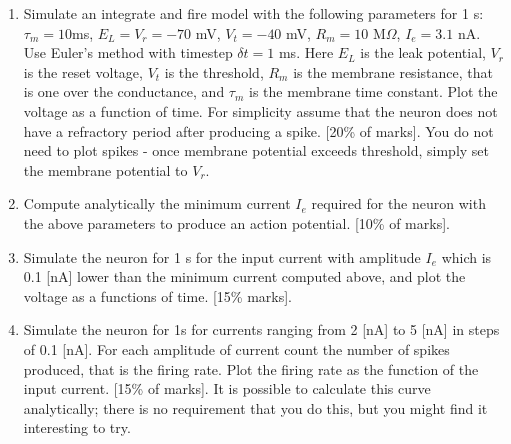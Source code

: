 \documentclass[11pt,a4paper]{scrartcl}
\begin{document}
\begin{enumerate}

\item Simulate an integrate and fire model with the following
  parameters for 1 s: $\tau_m = 10 $ms, $E_L = V_r = -70$ mV, $V_t =
  -40$ mV, $R_m= 10$ M$\Omega$, $I_e = 3.1 $ nA. Use Euler's method
  with timestep $\delta t = 1$ ms. Here $E_L$ is the leak potential,
  $V_r$ is the reset voltage, $V_t$ is the threshold, $R_m$ is the
  membrane resistance, that is one over the conductance, and $\tau_m$
  is the membrane time constant. Plot the voltage as a function of
  time. For simplicity assume that the neuron does not have a
  refractory period after producing a spike. [20\% of marks]. You do
  not need to plot spikes - once membrane potential exceeds threshold,
  simply set the membrane potential to $V_r$.

\item Compute analytically the minimum current $I_e$ required for the
  neuron with the above parameters to produce an action
  potential. [10\% of marks].

\item Simulate the neuron for 1 s for the input current with amplitude
  $I_e$ which is 0.1 [nA] lower than the minimum current computed
  above, and plot the voltage as a functions of time. [15\% marks].

\item Simulate the neuron for 1s for currents ranging from 2 [nA] to 5
  [nA] in steps of 0.1 [nA]. For each amplitude of current count the
  number of spikes produced, that is the firing rate. Plot the firing
  rate as the function of the input current. [15\% of marks]. It is
  possible to calculate this curve analytically; there is no
  requirement that you do this, but you might find it interesting to
  try.


\end{enumerate}
\end{document}
